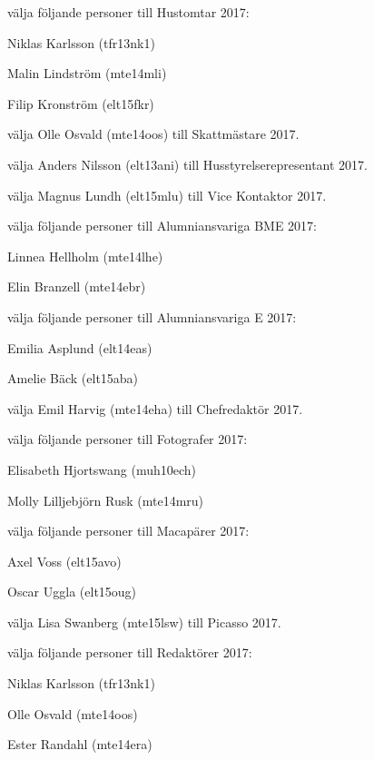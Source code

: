 \documentclass[10pt]{article}
\begin{document}
\begin{paragrafer}
\begin{paralist}
    \Mba välja följande personer till Hustomtar 2017:
    \begin{tightdashlist}
        \item Niklas Karlsson (tfr13nk1)
        \item Malin Lindström (mte14mli)
        \item Filip Kronström (elt15fkr)
    \end{tightdashlist}

    \Mba välja Olle Osvald (mte14oos) till Skattmästare 2017.

    \Mba välja Anders Nilsson (elt13ani) till Husstyrelserepresentant 2017.

    \Mba välja Magnus Lundh (elt15mlu) till Vice Kontaktor 2017.

    \Mba välja följande personer till Alumniansvariga BME 2017:
    \begin{tightdashlist}
        \item Linnea Hellholm (mte14lhe)
        \item Elin Branzell (mte14ebr)
    \end{tightdashlist}

    \Mba välja följande personer till Alumniansvariga E 2017:
    \begin{tightdashlist}
        \item Emilia Asplund (elt14eas)
        \item Amelie Bäck (elt15aba)
    \end{tightdashlist}

    \Mba välja Emil Harvig (mte14eha) till Chefredaktör 2017.

    \Mba välja följande personer till Fotografer 2017:
    \begin{tightdashlist}
        \item Elisabeth Hjortswang (muh10ech)
        \item Molly Lilljebjörn Rusk (mte14mru)
    \end{tightdashlist}

    \Mba välja följande personer till Macapärer 2017:
    \begin{tightdashlist}
        \item Axel Voss (elt15avo)
        \item Oscar Uggla (elt15oug)
    \end{tightdashlist}

    \Mba välja Lisa Swanberg (mte15lsw) till Picasso 2017.

    \Mba välja följande personer till Redaktörer 2017:
    \begin{tightdashlist}
        \item Niklas Karlsson (tfr13nk1)
        \item Olle Osvald (mte14oos)
        \item Ester Randahl (mte14era)
    \end{tightdashlist}


\end{paralist}
\end{paragrafer}
\end{document}
